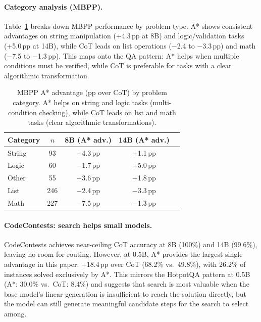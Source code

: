 \documentclass[10pt]{article}
\begin{document}
{\paragraph{Category analysis (MBPP).}
Table~\ref{tab:code_categories} breaks down MBPP performance by problem type. A* shows consistent advantages on string manipulation (+4.3\,pp at 8B) and logic/validation tasks (+5.0\,pp at 14B), while CoT leads on list operations ($-$2.4 to $-$3.3\,pp) and math ($-$7.5 to $-$1.3\,pp). This maps onto the QA pattern: A* helps when multiple conditions must be verified, while CoT is preferable for tasks with a clear algorithmic transformation.

\begin{table}[ht]
\centering
\small
\begin{tabular}{lcccc}
\toprule
\textbf{Category} & \textbf{$n$} & \textbf{8B (A* adv.)} & \textbf{14B (A* adv.)} \\
\midrule
String      & 93  & +4.3\,pp & +1.1\,pp \\
Logic       & 60  & $-$1.7\,pp & +5.0\,pp \\
Other       & 55  & +3.6\,pp & +1.8\,pp \\
List        & 246 & $-$2.4\,pp & $-$3.3\,pp \\
Math        & 227 & $-$7.5\,pp & $-$1.3\,pp \\
\bottomrule
\end{tabular}
\caption{MBPP A* advantage (pp over CoT) by problem category. A* helps on string and logic tasks (multi-condition checking), while CoT leads on list and math tasks (clear algorithmic transformations).}
\label{tab:code_categories}
\end{table}

\paragraph{CodeContests: search helps small models.}
CodeContests achieves near-ceiling CoT accuracy at 8B (100\%) and 14B (99.6\%), leaving no room for routing. However, at 0.5B, A* provides the largest single advantage in this paper: +18.4\,pp over CoT (68.2\% vs.\ 49.8\%), with 26.2\% of instances solved exclusively by A*. This mirrors the HotpotQA pattern at 0.5B (A*: 30.0\% vs.\ CoT: 8.4\%) and suggests that search is most valuable when the base model's linear generation is insufficient to reach the solution directly, but the model can still generate meaningful candidate steps for the search to select among.

}
\end{document}
